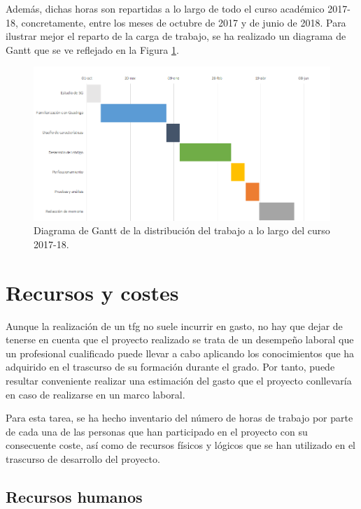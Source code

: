 Además, dichas horas son repartidas a lo largo de todo el curso académico 2017-18, concretamente, entre los meses de octubre de 2017 y de junio de 2018. Para ilustrar mejor el reparto de la carga de trabajo, se ha realizado un diagrama de Gantt que se ve reflejado en la Figura \ref{fig:gantt}.

\begin{figure}
	\centering
    \includegraphics[width=\textwidth]{imagenes/gantt.PNG}
	\caption{Diagrama de Gantt de la distribución del trabajo a lo largo del curso 2017-18.}
	\label{fig:gantt}
\end{figure}

\clearpage

\section{Recursos y costes}

Aunque la realización de un \acs{tfg} no suele incurrir en gasto, no hay que dejar de tenerse en cuenta que el proyecto realizado se trata de un desempeño laboral que un profesional cualificado puede llevar a cabo aplicando los conocimientos que ha adquirido en el trascurso de su formación durante el grado. Por tanto, puede resultar conveniente realizar una estimación del gasto que el proyecto conllevaría en caso de realizarse en un marco laboral.

Para esta tarea, se ha hecho inventario del número de horas de trabajo por parte de cada una de las personas que han participado en el proyecto con su consecuente coste, así como de recursos físicos y lógicos que se han utilizado en el trascurso de desarrollo del proyecto.

\subsection{Recursos humanos}

